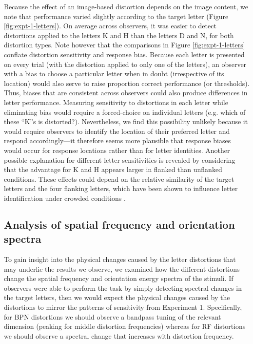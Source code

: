 \documentclass[doc, 11pt,a4paper,natbib]{apa6}\usepackage[]{graphicx}\usepackage[]{color}
\begin{document}
Because the effect of an image-based distortion depends on the image content, we note that performance varied slightly according to the target letter (Figure \ref{fig:expt-1-letters}).
On average across observers, it was easier to detect distortions applied to the letters K and H than the letters D and N, for both distortion types.
Note however that the comparisons in Figure \ref{fig:expt-1-letters} conflate distortion sensitivity and response bias.
Because each letter is presented on every trial (with the distortion applied to only one of the letters), an observer with a bias to choose a particular letter when in doubt (irrespective of its location) would also serve to raise proportion correct performance (or thresholds).
Thus, biases that are consistent across observers could also produce differences in letter performance.
Measuring sensitivity to distortions in each letter while eliminating bias would require a forced-choice on individual letters (e.g. which of these ``K''s is distorted?).
Nevertheless, we find this possibility unlikely because it would require observers to identify the location of their preferred letter and respond accordingly---it therefore seems more plausible that response biases would occur for response locations rather than for letter identities.
Another possible explanation for different letter sensitivities is revealed by considering that the advantage for K and H appears larger in flanked than unflanked conditions.
These effects could depend on the relative similarity of the target letters and the four flanking letters, which have been shown to influence letter identification under crowded conditions \citep{bernard_dependence_2011,hanus_quantifying_2013}.

\subsection{Analysis of spatial frequency and orientation spectra}
\label{sec:energy_appendix}

To gain insight into the physical changes caused by the letter distortions that may underlie the results we observe, we examined how the different distortions change the spatial frequency and orientation energy spectra of the stimuli.
If observers were able to perform the task by simply detecting spectral changes in the target letters, then we would expect the physical changes caused by the distortions to mirror the patterns of sensitivity from Experiment 1.
Specifically, for BPN distortions we should observe a bandpass tuning of the relevant dimension (peaking for middle distortion frequencies) whereas for RF distortions we should observe a spectral change that increases with distortion frequency.
\end{document}
